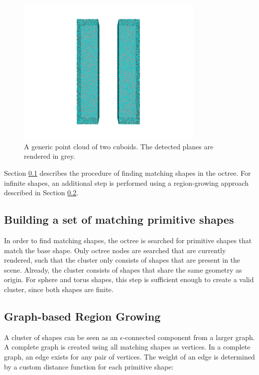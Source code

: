 \begin{figure}
    \centering
    \includegraphics[width=0.8\textwidth]{Shape_Detection/cuboids.png}
    \caption[Point cloud consisting of two cuboids.]
		{A generic point cloud of two cuboids. The detected planes are rendered in grey.}
    \label{fig:cuboids}
\end{figure}

Section \ref{sec:matchingSetBuilding} describes the procedure of finding matching shapes in the octree. For infinite shapes, an additional step is performed using a region-growing approach described in Section \ref{sec:regionGrowing}. 


\subsection{Building a set of matching primitive shapes}
\label{sec:matchingSetBuilding}

In order to find matching shapes, the octree is searched for primitive shapes that match the base shape. Only octree nodes are searched that are currently rendered, such that the cluster only consists of shapes that are present in the scene. Already, the cluster consists of shapes that share the same geometry as origin. For sphere and torus shapes, this step is sufficient enough to create a valid cluster, since both shapes are finite. 


\subsection{Graph-based Region Growing}
\label{sec:regionGrowing}

A cluster of shapes can be seen as an $\epsilon$-connected component from a larger graph. A complete graph is created using all matching shapes as vertices. In a complete graph, an edge exists for any pair of vertices. The weight of an edge is determined by a custom distance function for each primitive shape:

